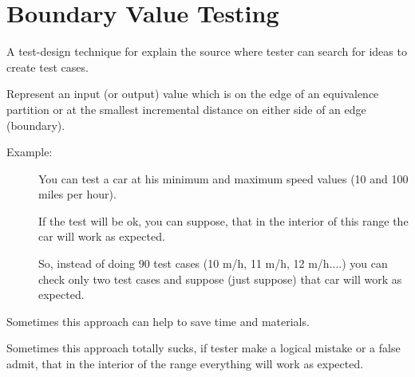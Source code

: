 \section{Boundary Value Testing}
\label{sec:Boundary Value Testing}

A test-design technique for explain the source where tester can search for ideas to create test cases.

Represent an input (or output) value which is on the edge of an equivalence partition or at the smallest incremental distance on either side of an edge (boundary).

\begin{description}
\item[Example:] 
       You can test a car at his minimum and maximum speed values (10 and 100 miles per hour). 
       
       If the test will be ok, you can suppose, that in the interior of this range the car will work as expected. 
       
       So, instead of doing 90 test cases (10 m/h, 11 m/h, 12 m/h....) you can check only two test cases and suppose (just suppose) that car will work as expected.
\end{description}

Sometimes this approach can help to save time and materials.

Sometimes this approach totally sucks, if tester make a logical mistake or a false admit, that in the interior of the range everything will work as expected.